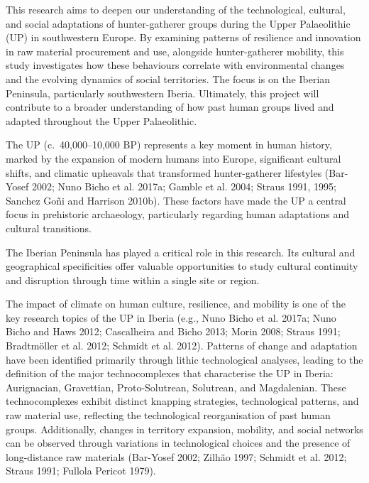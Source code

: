 \documentclass[
  a4paper,
  DIV=11,
  numbers=noendperiod]{scrreprt}
\begin{document}
This research aims to deepen our understanding of the technological,
cultural, and social adaptations of hunter-gatherer groups during the
Upper Palaeolithic (UP) in southwestern Europe. By examining patterns of
resilience and innovation in raw material procurement and use, alongside
hunter-gatherer mobility, this study investigates how these behaviours
correlate with environmental changes and the evolving dynamics of social
territories. The focus is on the Iberian Peninsula, particularly
southwestern Iberia. Ultimately, this project will contribute to a
broader understanding of how past human groups lived and adapted
throughout the Upper Palaeolithic.

The UP (c.~40,000--10,000 BP) represents a key moment in human history,
marked by the expansion of modern humans into Europe, significant
cultural shifts, and climatic upheavals that transformed hunter-gatherer
lifestyles (Bar-Yosef 2002; Nuno Bicho et al. 2017a; Gamble et al. 2004;
Straus 1991, 1995; Sanchez Goñi and Harrison 2010b). These factors have
made the UP a central focus in prehistoric archaeology, particularly
regarding human adaptations and cultural transitions.

The Iberian Peninsula has played a critical role in this research. Its
cultural and geographical specificities offer valuable opportunities to
study cultural continuity and disruption through time within a single
site or region.

The impact of climate on human culture, resilience, and mobility is one
of the key research topics of the UP in Iberia (e.g., Nuno Bicho et al.
2017a; Nuno Bicho and Haws 2012; Cascalheira and Bicho 2013; Morin 2008;
Straus 1991; Bradtmöller et al. 2012; Schmidt et al. 2012). Patterns of
change and adaptation have been identified primarily through lithic
technological analyses, leading to the definition of the major
technocomplexes that characterise the UP in Iberia: Aurignacian,
Gravettian, Proto-Solutrean, Solutrean, and Magdalenian. These
technocomplexes exhibit distinct knapping strategies, technological
patterns, and raw material use, reflecting the technological
reorganisation of past human groups. Additionally, changes in territory
expansion, mobility, and social networks can be observed through
variations in technological choices and the presence of long-distance
raw materials (Bar-Yosef 2002; Zilhão 1997; Schmidt et al. 2012; Straus
1991; Fullola Pericot 1979).
\end{document}
